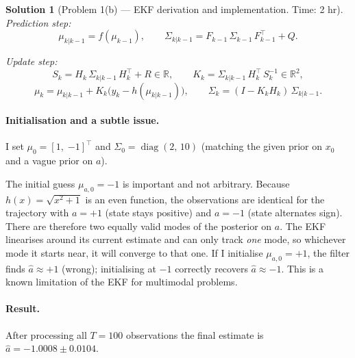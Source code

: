 \documentclass[11pt, reqno, letterpaper]{amsart}
\theoremstyle{plain}
\theoremstyle{definition}
\newtheorem{solution}[theorem]{Solution}
\begin{document}
\begin{solution}[Problem 1(b) — EKF derivation and implementation. Time: 2 hr]
\emph{Prediction step:}
\[
  \mu_{k|k-1} = f(\mu_{k-1}), \qquad
  \Sigma_{k|k-1} = F_{k-1}\,\Sigma_{k-1}\,F_{k-1}^\top + Q.
\]

\emph{Update step:}
\[
  S_k = H_k\,\Sigma_{k|k-1}\,H_k^\top + R \in \mathbb{R},\qquad
  K_k = \Sigma_{k|k-1}\,H_k^\top\,S_k^{-1} \in \mathbb{R}^2,
\]
\[
  \mu_k = \mu_{k|k-1} + K_k\bigl(y_k - h(\mu_{k|k-1})\bigr),\qquad
  \Sigma_k = (I - K_k H_k)\,\Sigma_{k|k-1}.
\]

\paragraph{Initialisation and a subtle issue.}
I set $\mu_0=[1,\;{-1}]^\top$ and $\Sigma_0=\operatorname{diag}(2,\,10)$
(matching the given prior on $x_0$ and a vague prior on $a$).

The initial guess $\mu_{a,0}=-1$ is important and not arbitrary.
Because $h(x)=\sqrt{x^2+1}$ is an even function, the observations are
identical for the trajectory with $a=+1$ (state stays positive) and $a=-1$
(state alternates sign).  There are therefore two equally valid modes of the
posterior on $a$.  The EKF linearises around its current estimate and can
only track \emph{one} mode, so whichever mode it starts near, it will
converge to that one.  If I initialise $\mu_{a,0}=+1$, the filter finds
$\hat a\approx+1$ (wrong); initialising at $-1$ correctly recovers
$\hat a\approx-1$.  This is a known limitation of the EKF for multimodal
problems.

\paragraph{Result.}
After processing all $T=100$ observations the final estimate is
$\hat{a} = -1.0008 \pm 0.0104$.
\end{solution}
\end{document}
